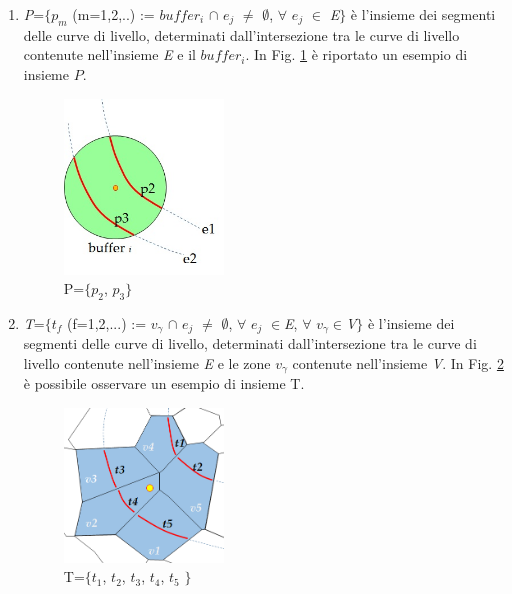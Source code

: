 \begin{enumerate}
\item\textit{P}=$\{$$p_m$ (m=1,2,..) := $buffer_i$ $\cap$ $e_j$ $\neq$ $\emptyset$, $\forall$ $e_j$ $\in$ \textit{E}$\}$ è l'insieme dei segmenti delle curve di livello, determinati dall'intersezione tra le curve di livello contenute nell'insieme \textit{E} e il $buffer_i$. In Fig. \ref{fig:p} è riportato un esempio di insieme $P$.
\begin{figure}[h]
\centering
\includegraphics[width=0.4\textwidth]{img/P}
\caption{P=$\{$$p_2$, $p_3$$\}$}
\label{fig:p}
\end{figure}
\newpage
\item\textit{T}=$\{$$t_f$ (f=1,2,...) := $v_\gamma$ $\cap$ $e_j$ $\neq$ $\emptyset$, $\forall$ $e_j$ $\in$\textit{E}, $\forall$ $v_\gamma$$\in$\textit{V}$\}$ è l'insieme dei segmenti delle curve di livello, determinati dall'intersezione tra le curve di livello contenute nell'insieme \textit{E} e le zone $v_\gamma$ contenute nell'insieme \textit{V}. In Fig. \ref{fig:t} è possibile osservare un esempio di insieme T.
\begin{figure}[h]
\centering
\includegraphics[width=0.4\textwidth]{img/T}
\caption{T=$\{$$t_1$, $t_2$, $t_3$, $t_4$, $t_5$ $\}$}
\label{fig:t}
\end{figure}


\end{enumerate}
